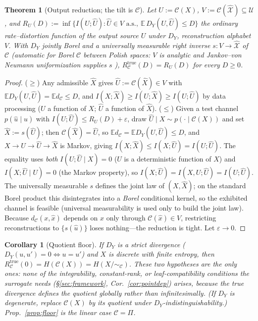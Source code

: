 \documentclass[11pt]{article}
\newtheorem{theorem}{Theorem}
\newtheorem{corollary}{Corollary}
\theoremstyle{definition}
\theoremstyle{remark}
\newcommand{\E}{\mathbb{E}}
\begin{document}
\begin{theorem}[Output reduction; the tilt is $\mathcal{C}$]\label{thm:B2}
Let $U:=\mathcal{C}(X)$, $V:=\mathcal{C}(\hat{\mathcal{X}})\subseteq\mathcal{U}$, and
$R_U(D):=\inf\{I(U;\hat U):\hat U\in V\text{ a.s.},\ \E\,D_Y(U,\hat U)\le D\}$ the
ordinary rate--distortion function of the output source $U$ under $D_Y$, reconstruction
alphabet $V$. With $D_Y$ jointly Borel and a universally measurable right inverse
$s:V\to\hat{\mathcal{X}}$ of $\mathcal{C}$ (automatic for Borel $\mathcal{C}$ between
Polish spaces: $V$ is analytic and Jankov--von Neumann uniformization supplies $s$
\cite{kechris1995}), $R_{\mathcal{C}}^{\mathrm{true}}(D)=R_U(D)$ for every $D\ge0$.
\end{theorem}
\begin{proof}
($\ge$) Any admissible $\hat X$ gives $\hat U:=\mathcal{C}(\hat X)\in V$ with
$\E D_Y(U,\hat U)=\E d_{\mathcal{C}}\le D$, and $I(X;\hat X)\ge I(U;\hat X)\ge
I(U;\hat U)$ by data processing ($U$ a function of $X$; $\hat U$ a function of
$\hat X$). ($\le$) Given a test channel $p(\hat u\mid u)$ with $I(U;\hat U)\le
R_U(D)+\varepsilon$, draw $\hat U\mid X\sim p(\cdot\mid\mathcal{C}(X))$ and set
$\hat X:=s(\hat U)$; then $\mathcal{C}(\hat X)=\hat U$, so $\E d_{\mathcal{C}}=\E
D_Y(U,\hat U)\le D$, and $X\to U\to\hat U\to\hat X$ is Markov, giving $I(X;\hat X)\le
I(X;\hat U)=I(U;\hat U)$. The equality uses \emph{both} $I(U;\hat U\mid X)=0$ ($U$ is
a deterministic function of $X$) and $I(X;\hat U\mid U)=0$ (the Markov property), so
$I(X;\hat U)=I(X,U;\hat U)=I(U;\hat U)$. The universally measurable $s$ defines the
joint law of $(X,\hat X)$; on the standard Borel product this disintegrates into a
\emph{Borel} conditional kernel, so the exhibited channel is feasible (universal
measurability is used only to build the joint law). Because $d_{\mathcal{C}}(x,\hat x)$
depends on $\hat x$ only through $\mathcal{C}(\hat x)\in V$, restricting reconstructions
to $\{s(\hat u)\}$ loses nothing---the reduction is tight. Let $\varepsilon\to0$.
\end{proof}

\begin{corollary}[Quotient floor]\label{cor:B2a}
If $D_Y$ is a \emph{strict} divergence ($D_Y(u,u')=0\iff u=u'$) and $X$ is discrete
with finite entropy, then $R_{\mathcal{C}}^{\mathrm{true}}(0)=H(\mathcal{C}(X))=
H(X/\!\sim_{\mathcal{C}})$. These two hypotheses are the only ones: \emph{none} of the
integrability, constant-rank, or leaf-compatibility conditions the \emph{surrogate}
needs (\S\ref{sec:framework}, Cor.~\ref{cor:pointdep}) arises, because the true
divergence defines the quotient globally rather than infinitesimally. (If $D_Y$ is
degenerate, replace $\mathcal{C}(X)$ by its quotient under $D_Y$-indistinguishability.)
Prop.~\ref{prop:floor} is the linear case $\mathcal{C}=\Pi$.
\end{corollary}
\end{document}
